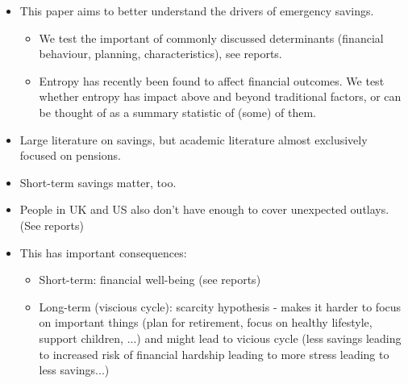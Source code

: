 

\begin{itemize}

    \item This paper aims to better understand the drivers of emergency
        savings. 

        \begin{itemize}
            \item We test the important of commonly discussed determinants
                (financial behaviour, planning, characteristics), see reports.

            \item Entropy has recently been found to affect financial outcomes.
                We test whether entropy has impact above and beyond traditional
                factors, or can be thought of as a summary statistic of (some)
                of them.
        \end{itemize}




    \item Large literature on savings, but academic literature almost
        exclusively focused on pensions.

    \item Short-term savings matter, too. 

    \item People in UK and US also don't have enough to cover unexpected
        outlays. (See reports)

    \item This has important consequences:

        \begin{itemize}

            \item Short-term: financial well-being (see reports)

            \item Long-term (viscious cycle): scarcity hypothesis - makes it
                harder to focus on important things (plan for retirement, focus
                on healthy lifestyle, support children, ...) and might lead to
                vicious cycle (less savings leading to increased risk of
                financial hardship leading to more stress leading to less
                savings...)

        \end{itemize}


\end{itemize}
